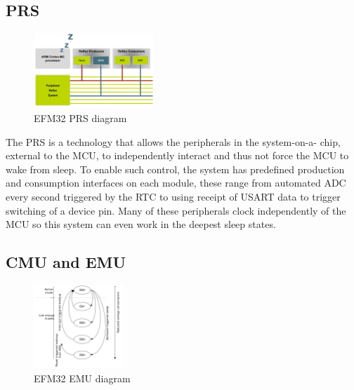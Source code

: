 
\subsection{\acf{PRS}}

\begin{figure}
  \vspace{-10pt}
  \begin{center}
    \includegraphics[width=0.4\textwidth, keepaspectratio=true]{images/peripheralreflexsystem_croped.jpg}
  \end{center}
  \caption[EFM32 \ac{PRS} Diagram]{EFM32 \ac{PRS} diagram}
  \vspace{-10pt}
\end{figure}

The \ac{PRS} is a technology that allows the peripherals in the system-on-a-
chip, external to the \ac{MCU}, to independently interact and thus not force the \ac{MCU} to wake from
sleep. To enable such control, the system has predefined production and consumption interfaces on
each module, these range from automated \ac{ADC} every second triggered by the \ac{RTC} to using receipt
of \ac{USART} data to trigger switching of a device pin. Many of these peripherals clock independently of
the \ac{MCU} so this system can even work in the deepest sleep states.

\subsection{\acf{CMU} and \acf{EMU}}

\begin{figure}
  \vspace{-10pt}
  \begin{center}
    \includegraphics[width=0.3\textwidth, keepaspectratio=true]{images/efm32_sleep_states.png}
  \end{center}
  \caption[EFM32 \ac{EMU} Diagram]{EFM32 \ac{EMU} diagram}
  \vspace{-10pt}
\end{figure}

